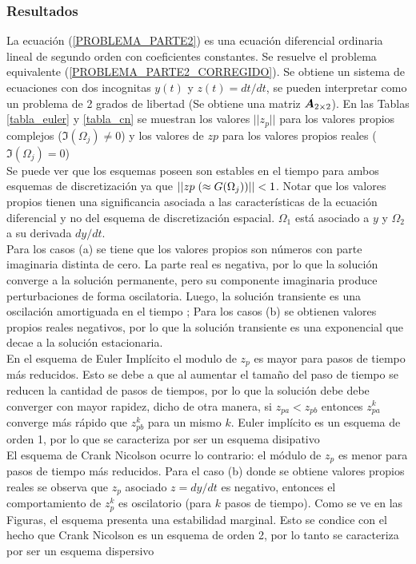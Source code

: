 \subsubsection{Resultados}

La ecuación (\ref{PROBLEMA_PARTE2}) es una ecuación diferencial ordinaria lineal de segundo orden con coeficientes constantes. Se resuelve el problema equivalente (\ref{PROBLEMA_PARTE2_CORREGIDO}). Se obtiene un sistema de ecuaciones con dos incognitas $y(t)$ y $z(t)=dt/dt$, se pueden interpretar como un problema de 2 grados de libertad (Se obtiene una matriz $\boldsymbol{A}_{2 \times 2}$). En las Tablas \ref{tabla_euler} y \ref{tabla_cn} se muestran los valores $||z_p||$ para los valores propios complejos ($ \Im(\Omega_j) \neq 0 $) y los valores de $zp$ para los valores propios reales ($\Im(\Omega_j) = 0$)\\

Se puede ver que los esquemas poseen son estables en el tiempo para ambos esquemas de discretización ya que $ || zp \hspace{0,1cm}(\approx G(\Omega_j)) || < 1 $. Notar que los valores propios tienen una significancia asociada a las características de la ecuación diferencial y no del esquema de discretización espacial. $\Omega_1$ está asociado a $y$ y $\Omega_2$ a su derivada $dy/dt$. \\

Para los casos (a) se tiene que los valores propios son números con parte imaginaria distinta de cero. La parte real es negativa, por lo que la solución converge a la solución permanente, pero su componente imaginaria produce perturbaciones de forma oscilatoria. Luego, la solución transiente es una oscilación amortiguada en el tiempo ; Para los casos (b) se obtienen valores propios reales negativos, por lo que la solución transiente es una exponencial que decae a la solución estacionaria. \\

En el esquema de Euler Implícito el modulo de $z_p$ es mayor para pasos de tiempo más reducidos. Esto se debe a que al aumentar el tamaño del paso de tiempo se reducen la cantidad de pasos de tiempos, por lo que la solución debe debe converger con mayor rapidez, dicho de otra manera, si $z_{pa} < z_{pb}$ entonces $z_{pa}^k$ converge más rápido que $z_{pb}^k$ para un mismo $k$. Euler implícito es un esquema de orden 1, por lo que se caracteriza por ser un esquema disipativo\\

El esquema de Crank Nicolson ocurre lo contrario: el módulo de $z_p$ es menor para pasos de tiempo más reducidos. Para el caso (b) donde se obtiene valores propios reales se observa que $z_p$ asociado $z=dy/dt$ es negativo, entonces el comportamiento de $z_p^k$ es oscilatorio (para $k$ pasos de tiempo). Como se ve en las Figuras, el esquema presenta una estabilidad marginal. Esto se condice con el hecho que Crank Nicolson es un esquema de orden 2, por lo tanto se caracteriza por ser un esquema dispersivo  

